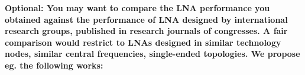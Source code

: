 
\begin{pexbox}{}
   \noindent \textbf{Optional: You may want to compare the LNA performance you obtained against the performance of LNA designed by international research groups, published in research journals of congresses. A fair comparison would restrict to LNAs designed in similar technology nodes, similar central frequencies, single-ended topologies. We propose eg. the following works:}
\end{pexbox}

